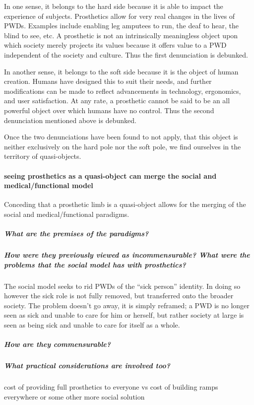 \documentclass[a4paper]{article}
\begin{document}
In one sense, it belongs to the hard side because it is able to impact the
experience of subjects. Prosthetics allow for very real changes in the lives
of PWDs. Examples include enabling leg amputees to run, the deaf to hear, the
blind to see, etc. A prosthetic is not an intrinsically meaningless object
upon which society merely projects its values because it offers value to a PWD
independent of the society and culture. Thus the first denunciation is
debunked.

In another sense, it belongs to the soft side because it is the object of
human creation. Humans have designed this to suit their needs, and further
modifications can be made to reflect advancements in technology, ergonomics,
and user satisfaction. At any rate, a prosthetic cannot be said to be an all
powerful object over which humans have no control. Thus the second
denunciation mentioned above is debunked.

Once the two denunciations have been found to not apply, that this object is
neither exclusively on the hard pole nor the soft pole,  we find ourselves in
the territory of quasi-objects.


\paragraph{seeing prosthetics as a quasi-object can merge the social and
medical/functional model}

Conceding that a prosthetic limb is a quasi-object allows for the merging of
the social and medical/functional paradigms. 

\subparagraph{What are the premises of the paradigms?}

\subparagraph{How were they previously viewed as incommensurable? What were
the problems that the social model has with prosthetics?}

The social model seeks to rid PWDs of the ``sick person'' identity. In doing so
however the sick role is not fully removed, but transferred onto the broader
society. The problem doesn’t go away, it is simply reframed; a PWD is no
longer seen as sick and unable to care for him or herself, but rather society
at large is seen as being sick and unable to care for itself as a whole.

\subparagraph{How are they commensurable?}

\subparagraph{What practical considerations are involved too?}

cost of providing full prosthetics to everyone vs cost of building ramps
everywhere or some other more social solution
\end{document}
